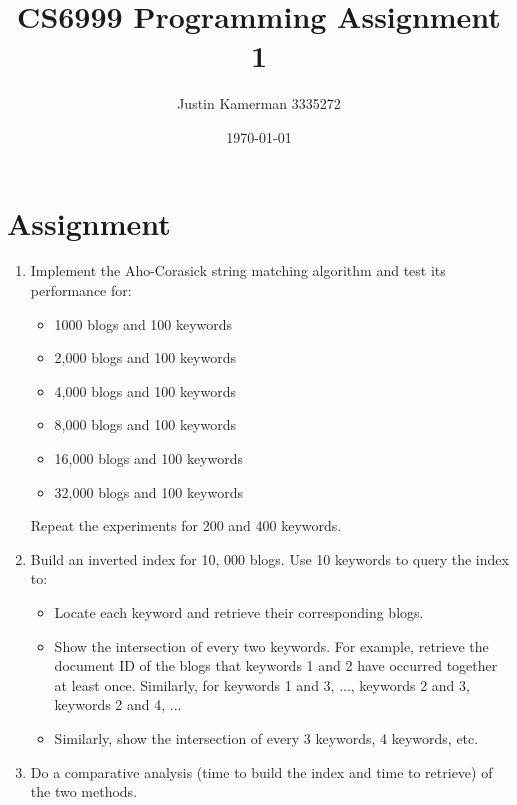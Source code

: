 \documentclass[10pt]{report}
\title{CS6999 Programming Assignment 1}
\author{Justin Kamerman 3335272}
\date{\today}
\begin{document}
\maketitle
\renewcommand*\thesection{\arabic{section}}

\section*{Assignment}
\begin{enumerate} 
\item Implement the Aho-Corasick string matching algorithm\cite{RefWorks:103} and test its performance for:
  \begin{itemize}
  \item 1000 blogs and  100 keywords
  \item 2,000 blogs and 100 keywords
  \item 4,000 blogs and 100 keywords
  \item 8,000 blogs and 100 keywords
  \item 16,000 blogs and 100 keywords
  \item 32,000 blogs and 100 keywords
  \end{itemize}
           
Repeat the experiments for 200 and 400 keywords.
      

\item Build an inverted index for 10, 000 blogs. Use 10 keywords to query the index to:
  \begin{itemize}
  \item Locate each keyword and retrieve their corresponding blogs.
  \item Show the intersection of every two keywords. For example, retrieve the document ID of the blogs that keywords 1 and 2 have occurred together at least once. Similarly, for keywords 1 and 3, ..., keywords 2 and 3, keywords 2 and 4, ...
    \item Similarly, show the intersection of every 3 keywords, 4 keywords, etc.
  \end{itemize}
  
\item Do a comparative analysis (time to build the index and time to retrieve) of the two methods.
\end{enumerate}

\end{document}
